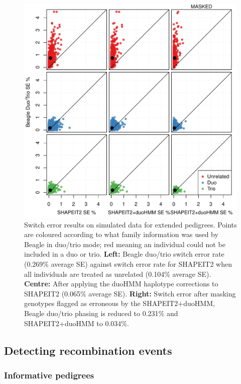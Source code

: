 \begin{figure}
  \begin{center} 
   \includegraphics[width=\textwidth]{chap4figs/beagletrio_vs_s2-3x3.pdf}
  \end{center}
  \caption[Comparison of SHAPEIT2 and Beagle on simulated pedigrees]{Switch error results on simulated data for extended pedigrees.  Points are coloured according to what family information was used by Beagle in duo/trio mode; red meaning an individual could not be included in a duo or trio. \textbf{Left:} Beagle duo/trio switch error rate (0.269\% average SE) against switch error rate for SHAPEIT2 when all individuals are treated as unrelated (0.104\% average SE). \textbf{Centre:} After applying the duoHMM haplotype corrections to SHAPEIT2 (0.065\% average SE). \textbf{Right:} Switch error after  masking genotypes flagged as erroneous by the SHAPEIT2+duoHMM, Beagle duo/trio phasing is reduced to 0.231\% and SHAPEIT2+duoHMM to 0.034\%.\label{fig:simfig1}}
\end{figure}

\subsection{Detecting recombination events}

\subsubsection{Informative pedigrees}

